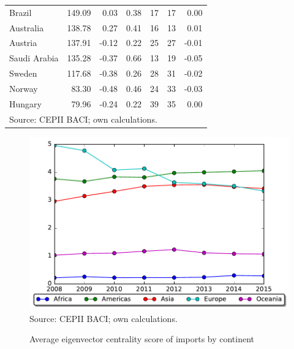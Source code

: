 \documentclass[10pt,letterpaper,pdftex]{article}
\begin{document}
\begin{table}[ht]
{\begin{tabular}{lrrrccr}
Brazil             & 149.09  & 0.03  & 0.38 & 17 & 17 & 0.00  \\
Australia          & 138.78  & 0.27  & 0.41 & 16 & 13 & 0.01  \\
Austria            & 137.91  & -0.12 & 0.22 & 25 & 27 & -0.01 \\
Saudi Arabia       & 135.28  & -0.37 & 0.66 & 13 & 19 & -0.05 \\
Sweden             & 117.68  & -0.38 & 0.26 & 28 & 31 & -0.02 \\
Norway             & 83.30    & -0.48 & 0.46 & 24 & 33 & -0.03 \\
Hungary            & 79.96   & -0.24 & 0.22 & 39 & 35 & 0.00 \\
\bottomrule 
\multicolumn{7}{l}{\footnotesize{Source: CEPII BACI; own calculations.}}\\
\end{tabular}}
\end{table}



\begin{figure}
  \caption{Average eigenvector centrality score of imports by continent}
  \centering
\includegraphics[scale=0.7]{plots/cent_continent.pdf} \\
\footnotesize{Source: CEPII BACI; own calculations.}\\
\end{figure}
\end{document}
